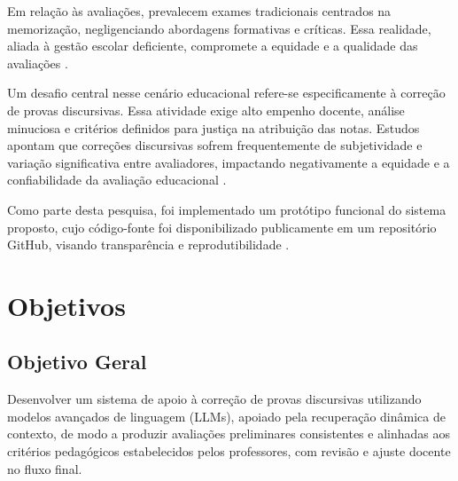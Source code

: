 Em relação às avaliações, prevalecem exames tradicionais centrados na memorização, negligenciando abordagens formativas e críticas. Essa realidade, aliada à gestão escolar deficiente, compromete a equidade e a qualidade das avaliações \cite{santos_articulacao_2016}.

Um desafio central nesse cenário educacional refere-se especificamente à correção de provas discursivas. Essa atividade exige alto empenho docente, análise minuciosa e critérios definidos para justiça na atribuição das notas. Estudos apontam que correções discursivas sofrem frequentemente de subjetividade e variação significativa entre avaliadores, impactando negativamente a equidade e a confiabilidade da avaliação educacional \cite{borges_avaliacao_2017}.

Como parte desta pesquisa, foi implementado um protótipo funcional do sistema proposto, cujo código-fonte foi disponibilizado publicamente em um repositório GitHub, visando transparência e reprodutibilidade \cite{ai_grading_system_repo_2026}.


\section{Objetivos}

\subsection{Objetivo Geral} 
Desenvolver um sistema de apoio à correção de provas discursivas utilizando modelos avançados de linguagem (LLMs), apoiado pela recuperação dinâmica de contexto, de modo a produzir avaliações preliminares consistentes e alinhadas aos critérios pedagógicos estabelecidos pelos professores, com revisão e ajuste docente no fluxo final.

